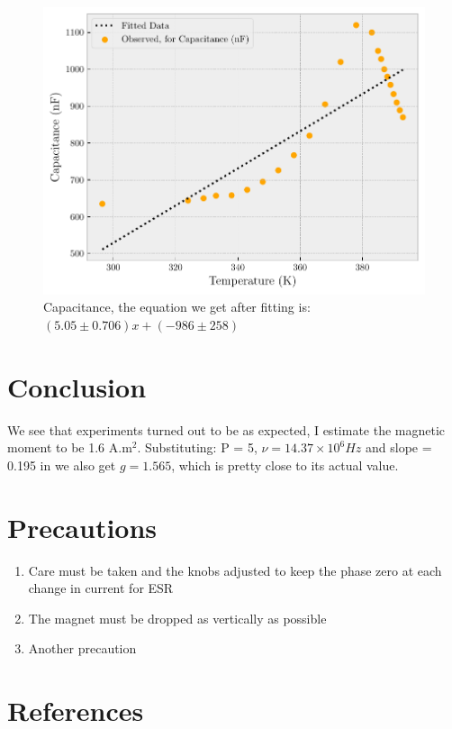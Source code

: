 \documentclass{double}
\begin{document}
\begin{figure}[H]
\end{figure}\begin{figure}[H]
\centering
\includegraphics[width = \columnwidth]{./Capacitancealphaunit0.pdf}
\caption{Capacitance, the equation we get after fitting is: $(5.05 \pm 0.706)x + (-986 \pm 258)$}
\label{g:"capacitance"}
\end{figure}
\section{Conclusion}
We see that experiments turned out to be as expected, I estimate the magnetic moment to be 1.6 A.m$^2$. Substituting: P = 5, $\nu = 14.37 \times 10^6 Hz$ and slope = 0.195 in we also get $g = 1.565$, which is pretty close to its actual value.


\section{Precautions}

\begin{enumerate}
	\item Care must be taken and the knobs adjusted to keep the phase zero at each change in current for ESR
	\item The magnet must be dropped as vertically as possible
	\item Another precaution
\end{enumerate}


\section{References}
\nocite{*}
\printbibliography[heading=none]
\end{document}
